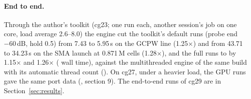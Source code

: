 \paragraph{End to end.} Through the author's toolkit (cg23; one run each, another session's job on one core, load
average 2.6--8.0) the engine cut the toolkit's default runs (probe end $-60$\,dB, hold 0.5) from 7.43 to 5.95\,s on
the GCPW line (1.25$\times$) and from 43.71 to 34.23\,s on the SMA launch at 0.871\,M cells (1.28$\times$), and the
full runs to  by 1.15$\times$ and 1.26$\times$ ( wall time), against the multithreaded
engine of the same build with its automatic thread count (). On cg27, under a heavier load, the GPU
runs gave the same port data (, section 9). The end-to-end
runs of cg29 are in Section~\ref{sec:results}.

